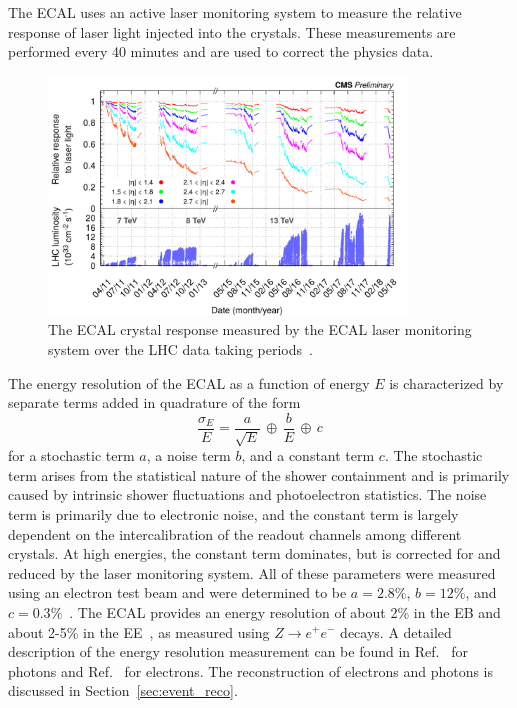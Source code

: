 The ECAL uses an active laser monitoring system to measure the relative response of laser light injected into the crystals.  These measurements are performed every 40 minutes and are used to correct the physics data. 

\begin{figure}[!htb]
	\centering
	\includegraphics[width=0.85\textwidth]{figures/ecal_laser}
	\caption{The ECAL crystal response measured by the ECAL laser monitoring system over the LHC data taking periods~\cite{CMS-DP-2018-015}.}
	\label{ecal_laser}
\end{figure}

The energy resolution of the ECAL as a function of energy $E$ is characterized by separate terms added in quadrature of the form
\begin{equation}
	\frac{\sigma_E}{E} = \frac{a}{\sqrt{E}}\,\oplus\,\frac{b}{E}\,\oplus\,c
\end{equation}
for a stochastic term $a$, a noise term $b$, and a constant term $c$. The stochastic term arises from the statistical nature of the shower containment and is primarily caused by intrinsic shower fluctuations and photoelectron statistics. The noise term is primarily due to electronic noise, and the constant term is largely dependent on the intercalibration of the readout channels among different crystals. At high energies, the constant term dominates, but is corrected for and reduced by the laser monitoring system. All of these parameters were measured using an electron test beam and were determined to be $a = 2.8\%$, $b = 12\%$, and $c = 0.3\%$~\cite{Chatrchyan:2013dga}. The ECAL provides an energy resolution of about 2\% in the EB and about 2-5\% in the EE~\cite{Chatrchyan:2013dga}, as measured using $Z \to e^+e^-$ decays. A detailed description of the energy resolution measurement can be found in Ref.~\cite{CMS:EGM-14-001} for photons and Ref.~\cite{Khachatryan:2015hwa} for electrons. The reconstruction of electrons and photons is discussed in Section~\ref{sec:event_reco}.


